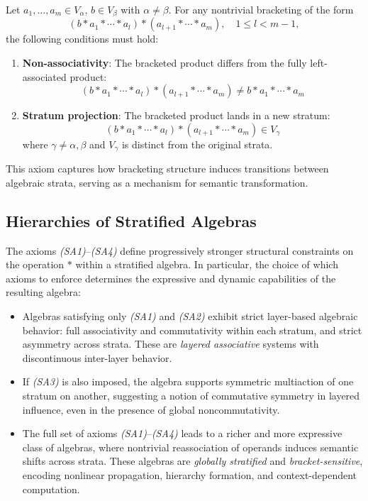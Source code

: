 \documentclass[12pt]{article}
\theoremstyle{definition}
\theoremstyle{plain}
\theoremstyle{remark}
\begin{document}
Let $a_1, \ldots, a_m \in V_\alpha$, $b \in V_\beta$ with $\alpha \neq \beta$. For any nontrivial bracketing of the form
\[
(b \ast a_1 \ast \cdots \ast a_l) \ast (a_{l+1} \ast \cdots \ast a_m), \quad 1 \leq l < m - 1,
\]
the following conditions must hold:

\begin{enumerate}
\item \textbf{Non-associativity}:
The bracketed product differs from the fully left-associated product:
\[
(b \ast a_1 \ast \cdots \ast a_l) \ast (a_{l+1} \ast \cdots \ast a_m) \neq b \ast a_1 \ast \cdots \ast a_m
\]

\item \textbf{Stratum projection}:
The bracketed product lands in a new stratum:
\[
(b \ast a_1 \ast \cdots \ast a_l) \ast (a_{l+1} \ast \cdots \ast a_m) \in V_\gamma
\]
where $\gamma \neq \alpha,\beta$ and $V_\gamma$ is distinct from the original strata.

\end{enumerate}

This axiom captures how bracketing structure induces transitions between algebraic strata, serving as a mechanism for semantic transformation.

\subsection*{Hierarchies of Stratified Algebras}

The axioms \emph{(SA1)}–\emph{(SA4)} define progressively stronger structural constraints on the operation \( * \) within a stratified algebra. In particular, the choice of which axioms to enforce determines the expressive and dynamic capabilities of the resulting algebra:

\begin{itemize}
    \item Algebras satisfying only \emph{(SA1)} and \emph{(SA2)} exhibit strict layer-based algebraic behavior: full associativity and commutativity within each stratum, and strict asymmetry across strata. These are \emph{layered associative} systems with discontinuous inter-layer behavior.

    \item If \emph{(SA3)} is also imposed, the algebra supports symmetric multiaction of one stratum on another, suggesting a notion of commutative symmetry in layered influence, even in the presence of global noncommutativity.

    \item The full set of axioms \emph{(SA1)}–\emph{(SA4)} leads to a richer and more expressive class of algebras, where nontrivial reassociation of operands induces semantic shifts across strata. These algebras are \emph{globally stratified} and \emph{bracket-sensitive}, encoding nonlinear propagation, hierarchy formation, and context-dependent computation.
\end{itemize}
\end{document}
